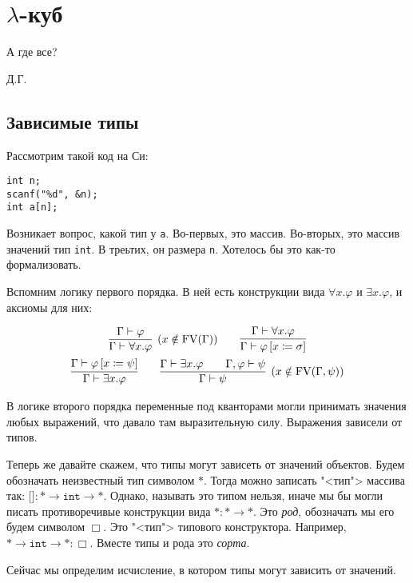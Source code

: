 \section{\texorpdfstring{$\lambda$-куб}{Lambda cube}}
\epigraph{А где все?}{Д.Г.}

\subsection{\texorpdfstring{Зависимые типы}{Depended types}}

Рассмотрим такой код на Си:
\begin{verbatim}
int n;
scanf("%d", &n);
int a[n];
\end{verbatim}
Возникает вопрос, какой тип у \texttt{a}.
Во-первых, это массив. Во-вторых, это массив значений тип \texttt{int}. В треьтих, он размера \texttt{n}.
Хотелось бы это как-то формализовать.

Вспомним логику первого порядка.
В ней есть конструкции вида $\forall x . \varphi$ и $\exists x . \varphi$, и аксиомы для них: %
\begin{@empty}
\inferspacing
\begin{gather*}
    \infer[(x \notin \FV(\Gamma))]{\Gamma \vdash \forall x . \varphi}{\Gamma \vdash \varphi} \qquad
    \infer{\Gamma \vdash \varphi \left[x \coloneqq \sigma\right]}{\Gamma \vdash \forall x . \varphi} \\
    \infer{\Gamma \vdash \exists x . \varphi}{\Gamma \vdash \varphi \left[x \coloneqq \psi\right]} \qquad
    \infer[(x \notin \FV(\Gamma, \psi))]{\Gamma \vdash \psi}{\Gamma \vdash \exists x . \varphi && \Gamma, \varphi \vdash \psi}
\end{gather*}
\end{@empty}%
В логике второго порядка переменные под кванторами могли принимать значения любых выражений, что давало там выразительную силу.
Выражения зависели от типов.

Теперь же давайте скажем, что типы могут зависеть от значений объектов.
Будем обозначать неизвестный тип символом $*$.
Тогда можно записать "<тип"> массива так: $\texttt{[]}: * \rightarrow \texttt{int} \rightarrow *$.
Однако, называть это типом нельзя, иначе мы бы могли писать противоречивые конструкции вида $* : * \rightarrow *$.
Это \emph{род}, обозначать мы его будем символом $\Box$. Это "<тип"> типового конструктора.
Например, $* \rightarrow \texttt{int} \rightarrow * : \Box$.
Вместе типы и рода это \emph{сорта}.

Сейчас мы определим исчисление, в котором типы могут зависить от значений.


